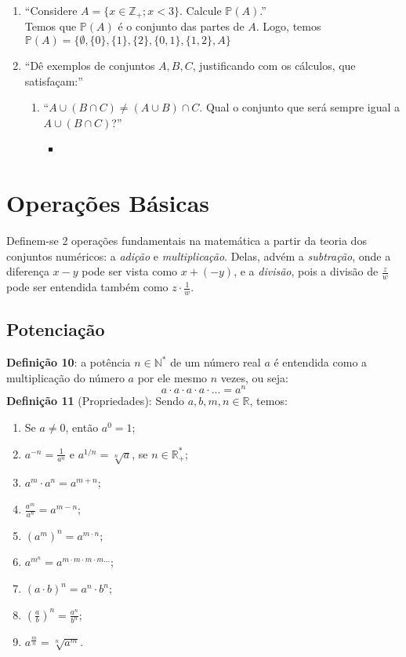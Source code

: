 \documentclass[13pt,letterpaper]{article}
\begin{document}
\begin{enumerate}
\begin{enumerate}
\begin{itemize}
        \end{itemize}
    \end{enumerate}
    \item \enquote{Considere $A = \{ x \in \mathbb{Z}_+ ; x < 3 \}$. Calcule $\mathbb{P}(A)$.} \\
    Temos que $\mathbb{P}(A)$ é o conjunto das partes de $A$. Logo, temos $\mathbb{P}(A) = \{\emptyset, \{0\}, \{1\}, \{2\}, \{0, 1\}, \{1, 2\}, A \}$
    \item \enquote{Dê exemplos de conjuntos $A, B, C$, justificando com os cálculos, que satisfaçam:}
    \begin{enumerate}
        \item \enquote{$A \cup (B \cap C) \ne (A \cup B) \cap C$. Qual o conjunto que será sempre igual a $A \cup (B \cap C)$?}
        \begin{itemize}
            \item 
        \end{itemize}
    \end{enumerate}
\end{enumerate}

\section{Operações Básicas}
Definem-se 2 operações fundamentais na matemática a partir da teoria dos conjuntos numéricos: a \emph{adição} e \emph{multiplicação}. Delas, advém a \emph{subtração}, onde a diferença $x - y$ pode ser vista como $x + (-y)$, e a \emph{divisão}, pois a divisão de $\frac{z}{w}$ pode ser entendida também como $z \cdot \frac{1}{w}$.
\subsection{Potenciação}
\textbf{Definição 10}: a potência $n \in \mathbb{N}^*$ de um número real $a$ é entendida como a multiplicação do número $a$ por ele mesmo $n$ vezes, ou seja:
\begin{displaymath}
    a \cdot a \cdot a \cdot a \cdot ... = a^n
\end{displaymath}
\textbf{Definição 11} (Propriedades): Sendo $a, b, m, n \in \mathbb{R}$, temos:
\begin{enumerate}
    \item Se $a \ne 0$, então $a^0 = 1$;
    \item $a^{-n} = \frac{1}{a^n}$ e $a^{1/n} = \sqrt[n]{a}$, se $n \in \mathbb{R}^*_+$;
    \item $a^m \cdot a^n = a^{m+n}$;
    \item $\frac{a^m}{a^n} = a^{m-n}$;
    \item $(a^m)^n = a^{m \cdot n}$;
    \item $a^{m^n} = a^{m \cdot m \cdot m \cdot m ...}$;
    \item $(a \cdot b)^n = a^n \cdot b^n$;
    \item $(\frac{a}{b})^n = \frac{a^n}{b^n}$;
    \item $a^{\frac{m}{n}} = \sqrt[n]{a^m}$.
\end{enumerate}
\end{document}
